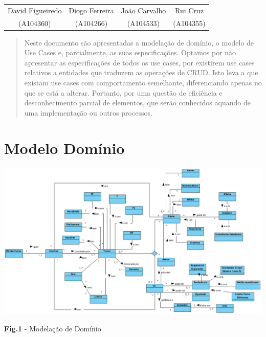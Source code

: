 \documentclass[a4paper,12pt]{article}
\begin{document}
\begin{titlepage}
\begin{center}
\begin{tabular}{c c c c}
            David Figueiredo & Diogo Ferreira & João Carvalho & Rui Cruz \\
            (A104360) &
            (A104266) &
            (A104533) &
            (A104355)   
            \end{tabular}
        \end{center}
      \vfill
    \end{titlepage}

    \vspace{1cm}

    \pagebreak
    \begin{abstract}
        Neste documento são apresentadas a modelação de domínio, o modelo de Use Cases e, parcialmente, as suas especificações. Optamos por não apresentar as especificações de todos os use cases, por existirem use cases relativos a entidades que traduzem as operações de CRUD. Isto leva a que existam use cases com comportamento semelhante, diferenciando apenas no que se está a alterar. Portanto, por uma questão de efici\^encia e desconhecimento parcial de elementos, que serão conhecidos aquando de uma implementação ou outros processos. 
    \end{abstract}

    \section{Modelo Domínio}

    \includegraphics[width=1\textwidth]{modeloDominio2.png}\\
    \begin{center}
        \textbf{Fig.1} - Modelação de Domínio\\
    \end{center}
    \vspace{0.1in}
\end{document}
